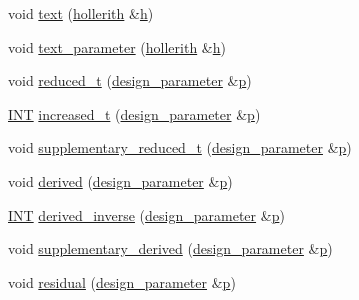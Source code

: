 \begin{DoxyCompactItemize}
\item 
void \mbox{\hyperlink{classdesign__parameter_a200510dc60483800cc6985b77d4ee50c}{text}} (\mbox{\hyperlink{classhollerith}{hollerith}} \&\mbox{\hyperlink{alphabet2_8_c_a16611451551e3d15916bae723c3f59f7}{h}})
\item 
void \mbox{\hyperlink{classdesign__parameter_a04f64f7acdaa60b07d19b4592b14c109}{text\+\_\+parameter}} (\mbox{\hyperlink{classhollerith}{hollerith}} \&\mbox{\hyperlink{alphabet2_8_c_a16611451551e3d15916bae723c3f59f7}{h}})
\item 
void \mbox{\hyperlink{classdesign__parameter_a5915575234fd91b3419a36c40f0bc374}{reduced\+\_\+t}} (\mbox{\hyperlink{classdesign__parameter}{design\+\_\+parameter}} \&\mbox{\hyperlink{alphabet2_8_c_a533391314665d6bf1b5575e9a9cd8552}{p}})
\item 
\mbox{\hyperlink{galois_8h_a09fddde158a3a20bd2dcadb609de11dc}{I\+NT}} \mbox{\hyperlink{classdesign__parameter_a8f39a90927d51e3cb3772bc98c94d7d0}{increased\+\_\+t}} (\mbox{\hyperlink{classdesign__parameter}{design\+\_\+parameter}} \&\mbox{\hyperlink{alphabet2_8_c_a533391314665d6bf1b5575e9a9cd8552}{p}})
\item 
void \mbox{\hyperlink{classdesign__parameter_ace491a14da6337d02eb91fd090c72345}{supplementary\+\_\+reduced\+\_\+t}} (\mbox{\hyperlink{classdesign__parameter}{design\+\_\+parameter}} \&\mbox{\hyperlink{alphabet2_8_c_a533391314665d6bf1b5575e9a9cd8552}{p}})
\item 
void \mbox{\hyperlink{classdesign__parameter_a72b457aff4b3747f90ed7fbda1941de0}{derived}} (\mbox{\hyperlink{classdesign__parameter}{design\+\_\+parameter}} \&\mbox{\hyperlink{alphabet2_8_c_a533391314665d6bf1b5575e9a9cd8552}{p}})
\item 
\mbox{\hyperlink{galois_8h_a09fddde158a3a20bd2dcadb609de11dc}{I\+NT}} \mbox{\hyperlink{classdesign__parameter_acbfce2a35f0c379d5888acdc8d74ae19}{derived\+\_\+inverse}} (\mbox{\hyperlink{classdesign__parameter}{design\+\_\+parameter}} \&\mbox{\hyperlink{alphabet2_8_c_a533391314665d6bf1b5575e9a9cd8552}{p}})
\item 
void \mbox{\hyperlink{classdesign__parameter_a17941dd86d09c510322cd0deee7e463f}{supplementary\+\_\+derived}} (\mbox{\hyperlink{classdesign__parameter}{design\+\_\+parameter}} \&\mbox{\hyperlink{alphabet2_8_c_a533391314665d6bf1b5575e9a9cd8552}{p}})
\item 
void \mbox{\hyperlink{classdesign__parameter_a927b3017b92919197fa53d9888409411}{residual}} (\mbox{\hyperlink{classdesign__parameter}{design\+\_\+parameter}} \&\mbox{\hyperlink{alphabet2_8_c_a533391314665d6bf1b5575e9a9cd8552}{p}})

\end{DoxyCompactItemize}
